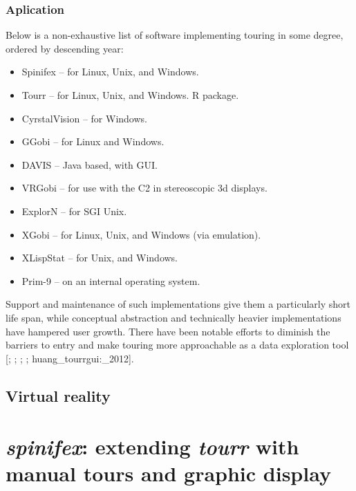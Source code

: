 \documentclass{monashthesis}
\begin{document}
\subsection{Aplication}\label{aplication}

Below is a non-exhaustive list of software implementing touring in some
degree, ordered by descending year:

\begin{itemize}
\tightlist
\item
  Spinifex \autocite{spinifex} -- for Linux, Unix, and Windows.
\item
  Tourr \autocite{wickham_tourr_2011} -- for Linux, Unix, and Windows. R
  package.
\item
  CyrstalVision \autocite{wegman_visual_2003} -- for Windows.
\item
  GGobi \autocite{swayne_ggobi:_2003} -- for Linux and Windows.
\item
  DAVIS \autocite{huh_davis:_2002} -- Java based, with GUI.
\item
  VRGobi \autocite{nelson_xgobi_1998} -- for use with the C2 in
  stereoscopic 3d displays.
\item
  ExplorN \autocite{carr_explorn:_1996} -- for SGI Unix.
\item
  XGobi \autocite{swayne_xgobi:_1991} -- for Linux, Unix, and Windows
  (via emulation).
\item
  XLispStat \autocite{tierney_lisp-stat:_1990} -- for Unix, and Windows.
\item
  Prim-9 \autocites{asimov_grand_1985}{fisherkeller_prim-9:_1974} -- on
  an internal operating system.
\end{itemize}

Support and maintenance of such implementations give them a particularly
short life span, while conceptual abstraction and technically heavier
implementations have hampered user growth. There have been notable
efforts to diminish the barriers to entry and make touring more
approachable as a data exploration tool {[}\textcite{huh_davis:_2002};
\textcite{swayne_ggobi:_2003}; \textcite{wegman_visual_2003};
\textcite{wickham_tourr_2011}; huang\_tourrgui:\_2012{]}.

\section{Virtual reality}\label{virtual-reality}

\chapter{\texorpdfstring{\emph{spinifex}: extending \emph{tourr} with
manual tours and graphic
display}{spinifex: extending tourr with manual tours and graphic display}}\label{ch:spinifex}
\end{document}
